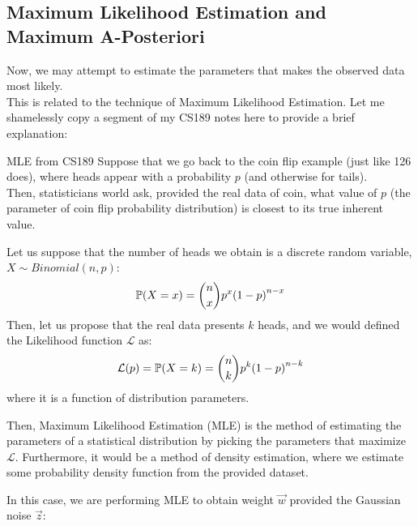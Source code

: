\subsection{Maximum Likelihood Estimation and Maximum A-Posteriori}
Now, we may attempt to estimate the parameters that makes the observed data most likely. \\
This is related to the technique of Maximum Likelihood Estimation. Let me shamelessly copy a segment of my CS189 notes here to provide a brief explanation:
\begin{ln-explain}{MLE from CS189}{}
    Suppose that we go back to the coin flip example (just like 126 does), where heads appear with a probability $p$ (and otherwise for tails). \\
    Then, statisticians world ask, provided the real data of coin, what value of $p$ (the parameter of coin flip probability distribution) is closest to its true inherent value.

    Let us suppose that the number of heads we obtain is a discrete random variable, $X \sim Binomial(n, p)$:
    \[
        \P(X = x) = \binom{n}{x} p^x {(1 - p)}^{n - x}
    \]
    Then, let us propose that the real data presents $k$ heads, and we would defined the Likelihood function $\mathcal{L}$ as:
    \[
        \mathcal{L}(p) = \P(X = k) = \binom{n}{k} p^k {(1 - p)}^{n - k}
    \]
    where it is a function of distribution parameters.
\end{ln-explain}
Then, Maximum Likelihood Estimation (MLE) is the method of estimating the parameters of a statistical distribution by picking the parameters that maximize $\mathcal{L}$.
Furthermore, it would be a method of density estimation, where we estimate some probability density function from the provided dataset.
\par
In this case, we are performing MLE to obtain weight $\vec{w}$ provided the Gaussian noise $\vec{z}$:    
